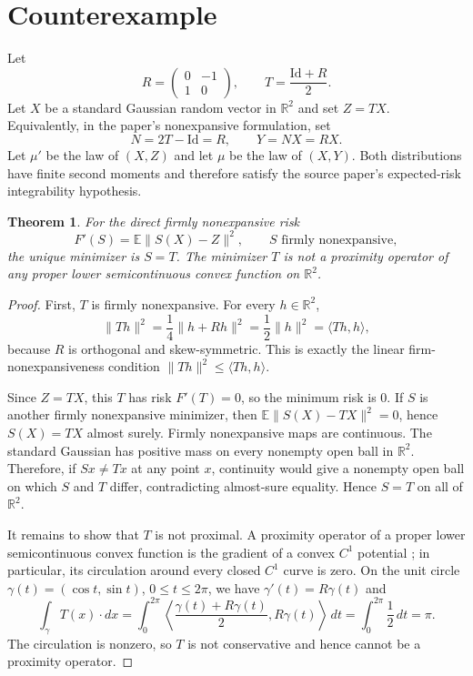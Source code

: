 \documentclass[11pt]{article}
\newtheorem{theorem}{Theorem}
\newcommand{\R}{\mathbb{R}}
\newcommand{\Id}{\mathrm{Id}}
\newcommand{\E}{\mathbb{E}}
\begin{document}
\section*{Counterexample}

Let
\[
        R=\begin{pmatrix}0&-1\\ 1&0\end{pmatrix},
        \qquad
        T=\frac{\Id+R}{2}.
\]
Let $X$ be a standard Gaussian random vector in $\R^2$ and set $Z=T X$.
Equivalently, in the paper's nonexpansive formulation, set
\[
        N=2T-\Id=R,\qquad Y=NX=RX.
\]
Let $\mu'$ be the law of $(X,Z)$ and let $\mu$ be the law of $(X,Y)$.
Both distributions have finite second moments and therefore satisfy the source
paper's expected-risk integrability hypothesis.

\begin{theorem}
For the direct firmly nonexpansive risk
\[
        F'(S)=\E\|S(X)-Z\|^2,
        \qquad S \text{ firmly nonexpansive},
\]
the unique minimizer is $S=T$.  The minimizer $T$ is not a proximity operator of
any proper lower semicontinuous convex function on $\R^2$.
\end{theorem}

\begin{proof}
First, $T$ is firmly nonexpansive.  For every $h\in\R^2$,
\[
        \|Th\|^2
        =\frac14\|h+Rh\|^2
        =\frac12\|h\|^2
        =\langle Th,h\rangle,
\]
because $R$ is orthogonal and skew-symmetric.  This is exactly the linear
firm-nonexpansiveness condition
$\|Th\|^2\leq \langle Th,h\rangle$.

Since $Z=TX$, this $T$ has risk $F'(T)=0$, so the minimum risk is $0$.  If $S$
is another firmly nonexpansive minimizer, then
$\E\|S(X)-TX\|^2=0$, hence $S(X)=TX$ almost surely.  Firmly nonexpansive maps
are continuous.  The standard Gaussian has positive mass on every nonempty open
ball in $\R^2$.  Therefore, if $Sx\neq Tx$ at any point $x$, continuity would
give a nonempty open ball on which $S$ and $T$ differ, contradicting almost-sure
equality.  Hence $S=T$ on all of $\R^2$.

It remains to show that $T$ is not proximal.  A proximity operator of a proper
lower semicontinuous convex function is the gradient of a convex $C^1$ potential
\cite{BCN,BC}; in particular, its circulation around every closed $C^1$ curve is
zero.  On the unit circle $\gamma(t)=(\cos t,\sin t)$, $0\leq t\leq 2\pi$, we
have $\gamma'(t)=R\gamma(t)$ and
\[
        \int_\gamma T(x)\cdot dx
        =
        \int_0^{2\pi}
        \left\langle \frac{\gamma(t)+R\gamma(t)}2,
        R\gamma(t)\right\rangle\,dt
        =
        \int_0^{2\pi}\frac12\,dt
        =\pi.
\]
The circulation is nonzero, so $T$ is not conservative and hence cannot be a
proximity operator.
\end{proof}
\end{document}
